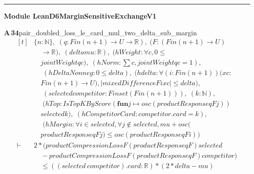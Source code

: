 \documentclass[conference]{IEEEtran}
\theoremstyle{definition}
\newcommand{\lean}[1]{\textsf{\footnotesize #1}}
\begin{document}
\vspace{4pt}\noindent\rule{\columnwidth}{0.4pt}\par\vspace{2pt}
\noindent\textbf{Module \lean{LeanD6MarginSensitiveExchangeV1}}\par\vspace{3pt}

\noindent\textbf{A\,34}\quad\lean{pair\_doubled\_loss\_le\_card\_mul\_two\_delta\_sub\_margin}
{\footnotesize\[ \begin{aligned}[t]
&\{ \mathit{n} : \mathbb{N} \},\; (\mathit{q} : \mathit{Fin} (\mathit{n} + 1) \to \mathit{U} \to \mathbb{R} ),\; (\mathit{F} : (\mathit{Fin} (\mathit{n} + 1) \to \mathit{U})\\
&\quad \to \mathbb{R} ),\; (\mathit{delta} \mathit{mu} : \mathbb{R} ),\; (\mathit{hWeight} : \forall \mathit{c}, 0 \leq\\
&\quad \mathit{jointWeight} \mathit{q} \mathit{c}),\; (\mathit{hNorm} : \textstyle\sum \mathit{c}, \mathit{jointWeight} \mathit{q} \mathit{c} = 1),\\
&\quad \; (\mathit{hDeltaNonneg} : 0 \leq \mathit{delta}),\; (\mathit{hdelta} : \forall (\mathit{i} : \mathit{Fin} (\mathit{n} + 1)) (\mathit{x} \mathit{c} :\\
&\quad \mathit{Fin} (\mathit{n} + 1) \to \mathit{U}), |\mathit{mixedDifference} \mathit{F} \mathit{i} \mathit{x} \mathit{c}| \leq \mathit{delta}),\\
&\quad \; (\mathit{selected} \mathit{competitor} : \mathit{Finset} (\mathit{Fin} (\mathit{n} + 1))),\; (\mathit{k} : \mathbb{N} ),\\
&\quad \; (\mathit{hTop} : \mathit{IsTopKByScore} (\mathbf{fun} \mathit{j} \mapsto \mathit{osc} (\mathit{productResponse} \mathit{q} \mathit{F} \mathit{j}))\\
&\quad \mathit{selected} \mathit{k}),\; (\mathit{hCompetitorCard} : \mathit{competitor}.\mathit{card} = \mathit{k}),\\
&\quad \; (\mathit{hMargin} : \forall \mathit{i} \in \mathit{selected}, \forall \mathit{j} \notin \mathit{selected}, \mathit{mu} + \mathit{osc} (\\
&\quad \mathit{productResponse} \mathit{q} \mathit{F} \mathit{j}) \leq \mathit{osc} (\mathit{productResponse} \mathit{q} \mathit{F} \mathit{i}))\\
\vdash\;&2 * (\mathit{productCompressionLoss} \mathit{F} (\mathit{productResponse} \mathit{q} \mathit{F}) \mathit{selected}\\
&\quad - \mathit{productCompressionLoss} \mathit{F} (\mathit{productResponse} \mathit{q} \mathit{F}) \mathit{competitor})\\
&\quad \leq ((\mathit{selected} \ \mathit{competitor}).\mathit{card} : \mathbb{R} ) * (2 * \mathit{delta} - \mathit{mu})
\end{aligned} \]}
\end{document}
